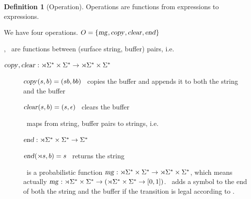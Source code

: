 \documentclass[12pt]{article}
\theoremstyle{definition}
\newtheorem{definition}{Definition}[section]
\begin{document}
\begin{definition}[Operation]
\label{def:ops}
  Operations are functions from expressions to expressions.

  We have four operations. $O=\{\text{\textsl{mg}},\text{\textsl{copy}},\text{\textsl{clear}},\text{\textsl{end}}\}$ 

  \cp, \cl~are  functions between (surface string, buffer) pairs, i.e.

  $\text{\textsl{copy}},\text{\textsl{clear}} : \rtimes\Sigma^* \times \Sigma^* \rightarrow  \rtimes\Sigma^* \times \Sigma^*$

  \begin{description}
  \item[\cp] $\text{\textsl{copy}}(s,b) = (sb,bb)$ \hfill \cp~copies the buffer and appends it to both the string and the buffer

 \item[\cl] $\text{\textsl{clear}}(s,b) = (s,\epsilon)$ \hfill \cl~clears the buffer


  \end{description}



  \begin{description}
  \item[\ed]   \ed~maps from string, buffer pairs to strings, i.e.

  $\text{\textsl{end}} : \rtimes\Sigma^* \times \Sigma^* \rightarrow  \Sigma^*$

  $\text{\textsl{end}}(\rtimes s,b) = s$ \hfill \ed~returns the string

  
  \end{description}





   \begin{description}

   \item[\mg] \mg~is a probabilistic function $\text{\textsl{mg}}:\rtimes\Sigma^*\times\Sigma^*\rightarrow \rtimes\Sigma^*\times\Sigma^*$, which means actually $\text{\textsl{mg}}:\rtimes\Sigma^*\times\Sigma^* \rightarrow (\rtimes\Sigma^*\times\Sigma^* \rightarrow [0,1])$.
     \mg~adds a symbol to the end of both the string and the buffer if the transition is legal according to \BIGR.
     

\end{description}
\end{definition}
\end{document}

